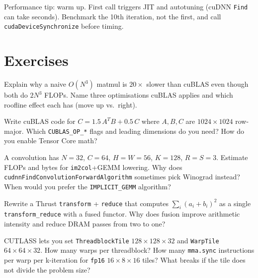 Performance tip: warm up. First call triggers JIT and autotuning (cuDNN \texttt{Find} can take seconds). Benchmark the 10th iteration, not the first, and call \texttt{cudaDeviceSynchronize} before timing.

\section{Exercises}
\begin{exercise}
Explain why a naive $O(N^{3})$ matmul is $20\times$ slower than cuBLAS even though both do $2N^{3}$ FLOPs. Name three optimisations cuBLAS applies and which roofline effect each has (move up vs.\ right).
\end{exercise}
\begin{exercise}
Write cuBLAS code for $C = 1.5\,A^{T}B + 0.5\,C$ where $A,B,C$ are $1024\times1024$ row-major. Which \texttt{CUBLAS\_OP\_*} flags and leading dimensions do you need? How do you enable Tensor Core math?
\end{exercise}
\begin{exercise}
A convolution has $N{=}32$, $C{=}64$, $H{=}W{=}56$, $K{=}128$, $R{=}S{=}3$. Estimate FLOPs and bytes for \texttt{im2col}+GEMM lowering. Why does \texttt{cudnnFindConvolutionForwardAlgorithm} sometimes pick Winograd instead? When would you prefer the \texttt{IMPLICIT\_GEMM} algorithm?
\end{exercise}
\begin{exercise}
Rewrite a Thrust \texttt{transform} + \texttt{reduce} that computes $\sum_i (a_i+b_i)^2$ as a single \texttt{transform\_reduce} with a fused functor. Why does fusion improve arithmetic intensity and reduce DRAM passes from two to one?
\end{exercise}
\begin{exercise}
CUTLASS lets you set \texttt{ThreadblockTile} $128{\times}128{\times}32$ and \texttt{WarpTile} $64{\times}64{\times}32$. How many warps per threadblock? How many \texttt{mma.sync} instructions per warp per k-iteration for \texttt{fp16} $16{\times}8{\times}16$ tiles? What breaks if the tile does not divide the problem size?
\end{exercise}

